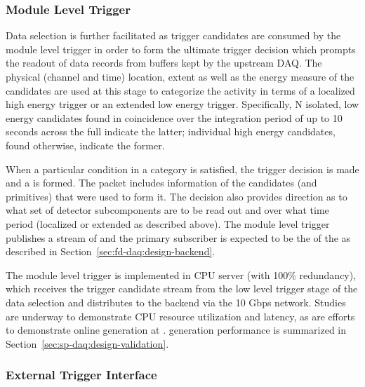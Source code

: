 

\subsubsection{Module Level Trigger}
\label{sec:daq:mlt}

Data selection is further facilitated as trigger candidates are consumed
by the module level trigger in order to form the ultimate trigger
decision which prompts the readout of data records from buffers kept by the upstream DAQ. 
The physical (channel and time) location, extent as well as the energy measure of the
candidates are used at this stage to categorize the activity in terms
of a localized high energy trigger or an extended low energy trigger. 
Specifically, N isolated, low energy candidates found in coincidence
over the integration period of up to 10 seconds across the full 
indicate the latter; individual high energy candidates, found
otherwise, indicate the former.

When a particular condition in a category is satisfied, the trigger
decision is made and a  is formed. 
The  packet includes information of the candidates (and primitives)
that were used to form it. 
The decision also provides direction as to what set of detector subcomponents
are to be read out and over what time period (localized or extended as described above). 
The module level trigger publishes a stream of  and the primary subscriber is expected to be the  of the  as described in Section~\ref{sec:fd-daq:design-backend}.

The module level trigger is implemented in  CPU server (with 100\%
redundancy), which
receives the trigger candidate stream from the low level trigger stage
of the data selection and distributes  to the
backend  via the 10 Gbps  network. Studies are
underway to demonstrate CPU resource utilization and latency, as are
efforts to demonstrate online  generation at .
 generation performance is summarized in
Section~\ref{sec:sp-daq:design-validation}.

\subsubsection{External Trigger Interface}

